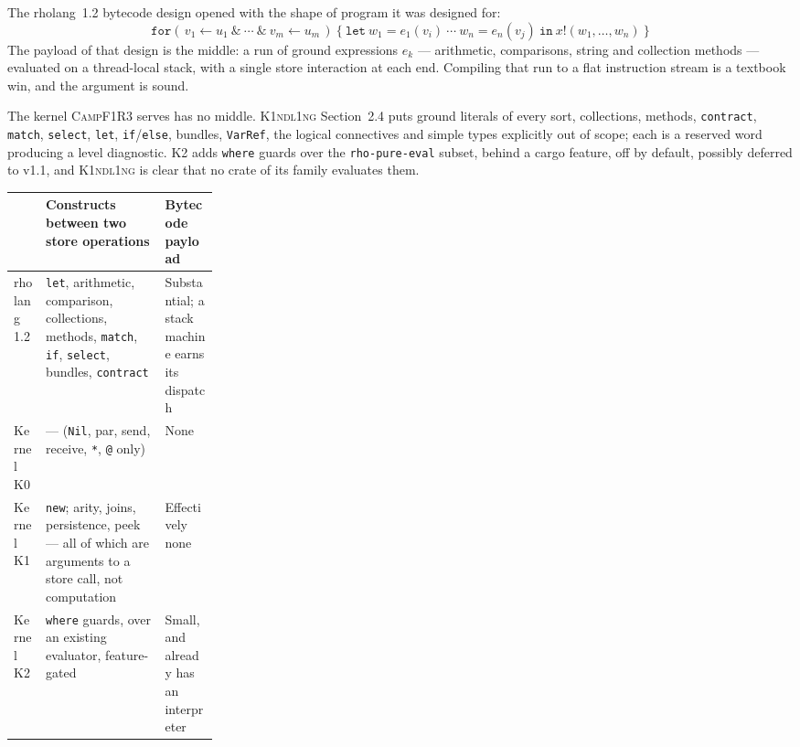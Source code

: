 \documentclass[11pt,a4paper]{article}
\newcommand{\code}[1]{\texttt{#1}}
\newcommand{\Kind}{\textsc{K1ndl1ng}}
\newcommand{\Camp}{\textsc{CampF1R3}}
\theoremstyle{definition}
\theoremstyle{plain}
\begin{document}
The rholang~1.2 bytecode design opened with the shape of program it was designed
for:
\[
  \code{for}(\,v_1\leftarrow u_1\ \&\ \cdots\ \&\ v_m\leftarrow u_m\,)\ \{\
     \code{let}\ w_1=e_1(v_i)\ \cdots\ w_n=e_n(v_j)\ \code{in}\ x!(w_1,\dots,w_n)\ \}
\]
The payload of that design is the middle: a run of ground expressions $e_k$ ---
arithmetic, comparisons, string and collection methods --- evaluated on a
thread-local stack, with a single store interaction at each end. Compiling that
run to a flat instruction stream is a textbook win, and the argument is sound.

The kernel \Camp{} serves has no middle. \Kind{} Section~2.4 puts ground
literals of every sort, collections, methods, \code{contract}, \code{match},
\code{select}, \code{let}, \code{if}/\code{else}, bundles, \code{VarRef}, the
logical connectives and simple types explicitly out of scope; each is a reserved
word producing a level diagnostic. K2 adds \code{where} guards over the
\code{rho-pure-eval} subset, behind a cargo feature, off by default, possibly
deferred to v1.1, and \Kind{} is clear that no crate of its family evaluates
them.

\begin{center}
\begin{tabularx}{\linewidth}{@{}l>{\raggedright\arraybackslash}X>{\raggedright\arraybackslash}p{0.26\linewidth}@{}}
\toprule
& Constructs between two store operations & Bytecode payload\\
\midrule
rholang 1.2 & \code{let}, arithmetic, comparison, collections, methods,
\code{match}, \code{if}, \code{select}, bundles, \code{contract} &
Substantial; a stack machine earns its dispatch\\
Kernel K0 & --- (\code{Nil}, par, send, receive, \code{*}, \code{@} only) & None\\
Kernel K1 & \code{new}; arity, joins, persistence, peek --- all of which are
arguments to a store call, not computation & Effectively none\\
Kernel K2 & \code{where} guards, over an existing evaluator, feature-gated &
Small, and already has an interpreter\\
\bottomrule
\end{tabularx}
\end{center}
\end{document}

